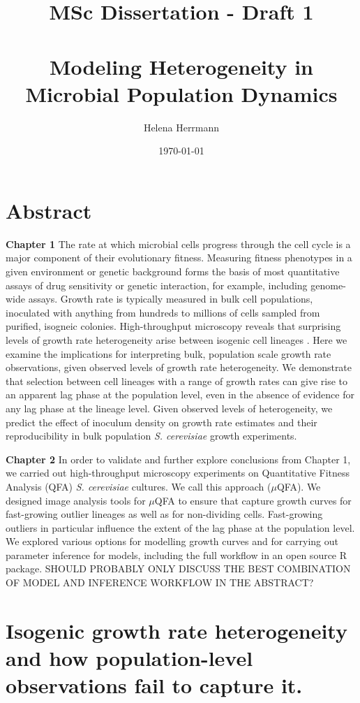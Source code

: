 \documentclass[a4paper]{article}
\title{MSc Dissertation - Draft 1 \\~\\ Modeling Heterogeneity in Microbial Population Dynamics}
\author{Helena Herrmann}
\date{\today}
\begin{document}
\maketitle

\section*{Abstract}

\textbf{Chapter 1} 
The rate at which microbial cells progress through the cell cycle is a major component of their evolutionary fitness.
Measuring fitness phenotypes in a given environment or genetic background forms the basis of most quantitative assays of drug sensitivity or genetic interaction, for example, including genome-wide assays.
Growth rate is typically measured in bulk cell populations, inoculated with anything from hundreds to millions of cells sampled from purified, isogneic colonies.
High-throughput microscopy reveals that surprising levels of growth rate heterogeneity arise between isogenic cell lineages \cite{Levy12,Ziv13}.
Here we examine the implications for interpreting bulk, population scale growth rate observations, given observed levels of growth rate heterogeneity.
We demonstrate that selection between cell lineages with a range of growth rates can give rise to an apparent lag phase at the population level, even in the absence of evidence for any lag phase at the lineage level.
Given observed levels of heterogeneity, we predict the effect of inoculum density on growth rate estimates and their reproducibility in bulk population \textit{S. cerevisiae} growth experiments.

\textbf{Chapter 2}
In order to validate and further explore conclusions from Chapter 1, we carried out high-throughput microscopy experiments on Quantitative Fitness Analysis (QFA) \textit{S. cerevisiae} cultures.
We call this approach ($\mu$QFA).
We designed image analysis tools for $\mu$QFA to ensure that capture growth curves for fast-growing outlier lineages as well as for non-dividing cells.
Fast-growing outliers in particular influence the extent of the lag phase at the population level.
We explored various options for modelling growth curves and for carrying out parameter inference for models, including the full workflow in an open source R package.
{SHOULD PROBABLY ONLY DISCUSS THE BEST COMBINATION OF MODEL AND INFERENCE WORKFLOW IN THE ABSTRACT?}

\section{Isogenic growth rate heterogeneity and how population-level observations fail to capture it.}
\end{document}
